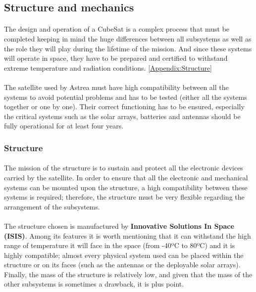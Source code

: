 \subsection{Structure and mechanics}

\paragraph{}The design and operation of a CubeSat is a complex process that must be completed keeping in mind the huge differences between all subsystems as well as the role they will play during the lifetime of the mission. And since these systems will operate in space, they have to be prepared and certified to withstand extreme temperature and radiation conditions. \ref{Appendix:Structure}

\paragraph{}The satellite used by Astrea must have high compatibility between all the systems to avoid potential problems and has to be tested (either all the systems together or one by one). Their correct functioning has to be ensured, especially the critical systems such as the solar arrays, batteries and antennas should be fully operational for at least four years.

\subsubsection{Structure}

\paragraph{}The mission of the structure is to sustain and protect all the electronic devices carried by the satellite. In order to ensure that all the electronic and mechanical systems can be mounted upon the structure, a high compatibility between these systems is required; therefore, the structure must be very flexible regarding the arrangement of the subsystems.

\paragraph{}The structure chosen is manufactured by \textbf{Innovative Solutions In Space (ISIS)}. Among its features it is worth mentioning that it can withstand the high range of temperature it will face in the space (from -40ºC to 80ºC) and it is highly compatible; almost every physical system  used can be placed within the structure or on its faces (such as the antennas or the deployable solar arrays). Finally, the mass of the structure is relatively low, and given that the mass of the other subsystems is sometimes a drawback, it is plus point.

